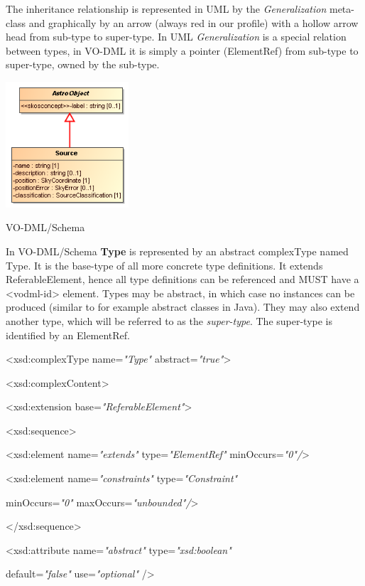 \documentclass[10pt,a4paper]{ivoa}
\begin{document}
The inheritance relationship is represented in UML by the
\emph{Generalization} meta-class and graphically by an arrow (always red
in our profile) with a hollow arrow head from sub-type to super-type. In
UML \emph{Generalization} is a special relation between types, in VO-DML
it is simply a pointer (ElementRef) from sub-type to super-type, owned
by the sub-type.

\includegraphics[width=1.8in,height=1.84167in]{./media/image12.png}

VO-DML/Schema

In VO-DML/Schema \textbf{Type} is represented by an abstract complexType
named Type. It is the base-type of all more concrete type definitions.
It extends ReferableElement, hence all type definitions can be
referenced and MUST have a \textless vodml-id\textgreater{} element.
Types may be abstract, in which case no instances can be produced
(similar to for example abstract classes in Java). They may also extend
another type, which will be referred to as the \emph{super-type}. The
super-type is identified by an ElementRef.

\textless xsd:complexType name=\emph{"Type"}
abstract=\emph{"true"}\textgreater{}

\textless xsd:complexContent\textgreater{}

\textless xsd:extension base=\emph{"ReferableElement"}\textgreater{}

\textless xsd:sequence\textgreater{}

\textless xsd:element name=\emph{"extends"} type=\emph{"ElementRef"}
minOccurs=\emph{"0"/}\textgreater{}

\textless xsd:element name=\emph{"constraints"} type=\emph{"Constraint"}

minOccurs=\emph{"0"} maxOccurs=\emph{"unbounded"/}\textgreater{}

\textless/xsd:sequence\textgreater{}

\textless xsd:attribute name=\emph{"abstract"} type=\emph{"xsd:boolean"}

default=\emph{"false"} use=\emph{"optional"} /\textgreater{}
\end{document}
